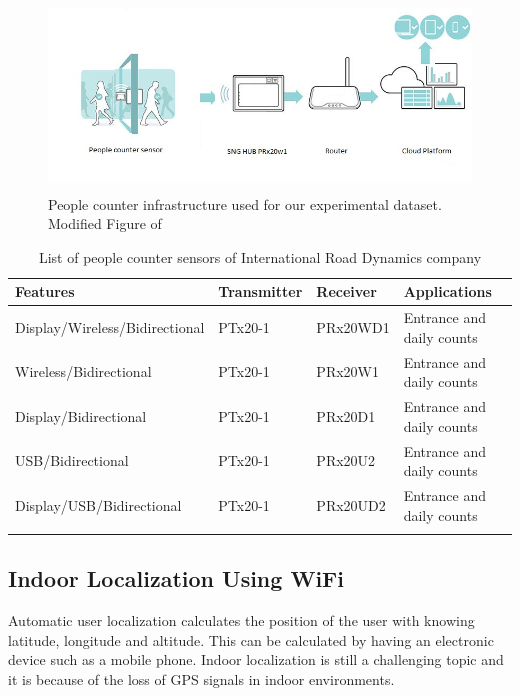 \documentclass[../UNBThesis2.tex]{subfiles}
\begin{document}
\begin{figure}
\centering
\includegraphics[width = 12cm,height = 5cm]{image/pc.jpg}
\caption{People counter infrastructure used for our experimental dataset. Modified Figure of \protect\cite{SensM}}
\label{people}
\end{figure}


\begin{table}[!h]{}
\small
\centering
\caption{List of people counter sensors of International Road Dynamics company}%
\begin{tabular}{llll}
\toprule
\textbf{Features} & \textbf{Transmitter} & \textbf{Receiver}  & \textbf{Applications}     \\
\midrule
Display/Wireless/Bidirectional     &  PTx20-1 & PRx20WD1 & Entrance and daily counts\\ 
Wireless/Bidirectional             &  PTx20-1 & PRx20W1  & Entrance and daily counts\\ 
Display/Bidirectional              &  PTx20-1 & PRx20D1  & Entrance and daily counts\\ 
USB/Bidirectional                  &  PTx20-1 & PRx20U2  & Entrance and daily counts\\ 
Display/USB/Bidirectional          &  PTx20-1 & PRx20UD2 & Entrance and daily counts\\ 
\bottomrule
\label{sensor}
\end{tabular}
\end{table}




\subsection{Indoor Localization Using WiFi}

Automatic user localization calculates the position of the user with knowing latitude, longitude and altitude. This can be calculated by having an electronic device such as a mobile phone. Indoor localization is still a challenging topic and it is because of the loss of GPS signals in indoor environments.
\end{document}
